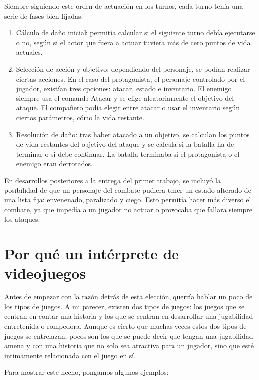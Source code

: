 Siempre siguiendo este orden de actuación en los turnos, cada turno tenía una serie de fases bien fijadas:
\begin{enumerate}
	\item Cálculo de daño inicial: permitía calcular si el siguiente turno debía ejecutarse o no, según si el actor que fuera a actuar tuviera más de cero puntos de vida actuales.
	\item Selección de acción y objetivo: dependiendo del personaje, se podían realizar ciertas acciones. En el caso del protagonista, el personaje controlado por el jugador, existían tres opciones: atacar, estado e inventario. El enemigo siempre usa el comando Atacar y se elige aleatoriamente el objetivo del ataque. El compañero podía elegir entre atacar o usar el inventario según ciertos parámetros, cómo la vida restante.
	\item Resolución de daño: tras haber atacado a un objetivo, se calculan los puntos de vida restantes del objetivo del ataque y se calcula si la batalla ha de terminar o si debe continuar. La batalla terminaba si el protagonista o el enemigo eran derrotados.
\end{enumerate}
	
En desarrollos posteriores a la entrega del primer trabajo, se incluyó la posibilidad de que un personaje del combate pudiera tener un estado alterado de una lista fija: envenenado, paralizado y ciego.
Esto permitía hacer más diverso el combate, ya que impedía a un jugador no actuar o provocaba que fallara siempre los ataques.

\section{Por qué un intérprete de videojuegos}

Antes de empezar con la razón detrás de esta elección, querría hablar un poco de los tipos de juegos. A mi parecer, existen dos tipos de juegos: los juegos que se centran en contar una historia y los que se centran en desarrollar una jugabilidad entretenida o rompedora. Aunque es cierto que muchas veces estos dos tipos de juegos se entrelazan, pocos son los que se puede decir que tengan una jugabilidad amena y con una historia que no solo sea atractiva para un jugador, sino que esté intimamente relacionada con el juego en sí.

Para mostrar este hecho, pongamos algunos ejemplos:

